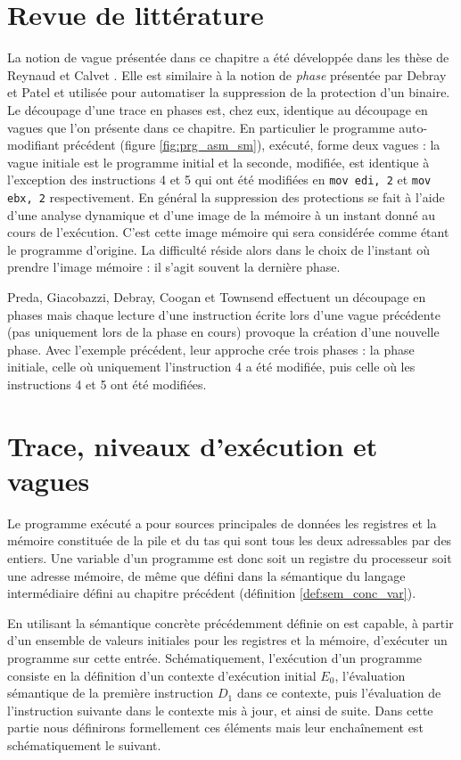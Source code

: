 \section{Revue de littérature}
La notion de vague présentée dans ce chapitre a été développée dans les thèse de Reynaud \cite{Reynaud2010} et Calvet \cite{Calvet2013}.
Elle est similaire à la notion de \emph{phase} présentée par Debray et Patel \cite{DP10} et utilisée pour automatiser la suppression de la protection d'un binaire. Le découpage d'une trace en phases est, chez eux, identique au découpage en vagues que l'on présente dans ce chapitre.
En particulier le programme auto-modifiant précédent (figure \ref{fig:prg_asm_sm}), exécuté, forme deux vagues : la vague initiale est le programme initial et la seconde, modifiée, est identique à l'exception des instructions 4 et 5 qui ont été modifiées en \texttt{mov edi, 2} et \texttt{mov ebx, 2} respectivement.
En général la suppression des protections se fait à l'aide d'une analyse dynamique et d'une image de la mémoire à un instant donné au cours de l'exécution. C'est cette image mémoire qui sera considérée comme étant le programme d'origine. La difficulté réside alors dans le choix de l'instant où prendre l'image mémoire : il s'agit souvent la dernière phase.

Preda, Giacobazzi, Debray, Coogan et Townsend \cite{PGDCT10} effectuent un découpage en phases mais chaque lecture d'une instruction écrite lors d'une vague précédente (pas uniquement lors de la phase en cours) provoque la création d'une nouvelle phase.
Avec l'exemple précédent, leur approche crée trois phases : la phase initiale, celle où uniquement l'instruction 4 a été modifiée, puis celle où les instructions 4 et 5 ont été modifiées.

\section{Trace, niveaux d'exécution et vagues}
Le programme exécuté a pour sources principales de données les registres et la mémoire constituée de la pile et du tas qui sont tous les deux adressables par des entiers. Une variable d'un programme est donc soit un registre du processeur soit une adresse mémoire, de même que défini dans la sémantique du langage intermédiaire défini au chapitre précédent (définition \ref{def:sem_conc_var}).

En utilisant la sémantique concrète précédemment définie on est capable, à partir d'un ensemble de valeurs initiales pour les registres et la mémoire, d'exécuter un programme sur cette entrée.
Schématiquement, l'exécution d'un programme consiste en la définition d'un contexte d'exécution initial $E_0$, l'évaluation sémantique de la première instruction $D_1$ dans ce contexte, puis l'évaluation de l'instruction suivante dans le contexte mis à jour, et ainsi de suite. Dans cette partie nous définirons formellement ces éléments mais leur enchaînement est schématiquement le suivant.

